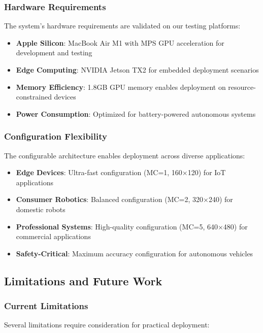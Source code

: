 \documentclass[12pt,oneside]{book}
\begin{document}
\subsubsection{Hardware Requirements}

The system's hardware requirements are validated on our testing platforms:

\begin{itemize}
\item \textbf{Apple Silicon}: MacBook Air M1 with MPS GPU acceleration for development and testing
\item \textbf{Edge Computing}: NVIDIA Jetson TX2 for embedded deployment scenarios
\item \textbf{Memory Efficiency}: 1.8GB GPU memory enables deployment on resource-constrained devices
\item \textbf{Power Consumption}: Optimized for battery-powered autonomous systems
\end{itemize}

\subsubsection{Configuration Flexibility}

The configurable architecture enables deployment across diverse applications:

\begin{itemize}
\item \textbf{Edge Devices}: Ultra-fast configuration (MC=1, 160$\times$120) for IoT applications
\item \textbf{Consumer Robotics}: Balanced configuration (MC=2, 320$\times$240) for domestic robots
\item \textbf{Professional Systems}: High-quality configuration (MC=5, 640$\times$480) for commercial applications
\item \textbf{Safety-Critical}: Maximum accuracy configuration for autonomous vehicles
\end{itemize}

\subsection{Limitations and Future Work}

\subsubsection{Current Limitations}

Several limitations require consideration for practical deployment:
\end{document}

